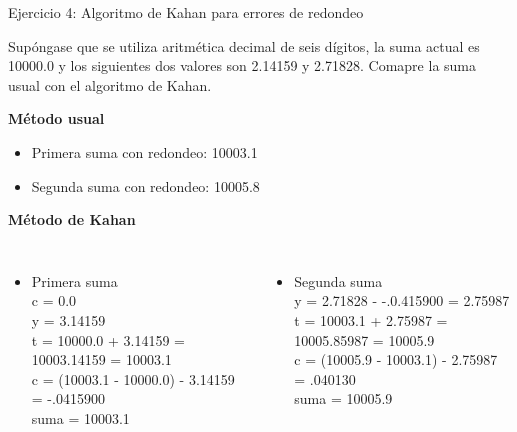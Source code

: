 		\begin{frame}{Ejercicio 4: Algoritmo de Kahan para errores de redondeo}	
			\fontsize{8}{10}\selectfont
			\begin{exercise}
				Supóngase que se utiliza aritmética decimal de seis dígitos, la suma actual es 10000.0 y los siguientes dos valores son 2.14159 y 2.71828. Comapre la suma usual con el algoritmo de Kahan.
			\end{exercise}
	
			\textbf{Método usual}
			\begin{itemize}
				\item Primera suma con redondeo: 10003.1 \\
				\item Segunda suma con redondeo: 10005.8 \\
			\end{itemize}
		
			\textbf{Método de Kahan}
			\begin{columns}
					\begin{itemize}
						\item Primera suma \\
						c = 0.0 \\
						y = 3.14159  \\
						t = 10000.0 + 3.14159 = 10003.14159 = 10003.1 \\
						c = (10003.1 - 10000.0) - 3.14159  = -.0415900 \\
						suma = 10003.1
					\end{itemize}										
					\begin{itemize}
						\item Segunda suma 	\\					
						y = 2.71828 - -.0.415900 = 2.75987 \\
						t = 10003.1 + 2.75987 = 10005.85987 = 10005.9 \\
						c = (10005.9 - 10003.1) - 2.75987 = .040130 \\
						suma = 10005.9 \\					
					\end{itemize}										
			\end{columns}
						
		\end{frame}									